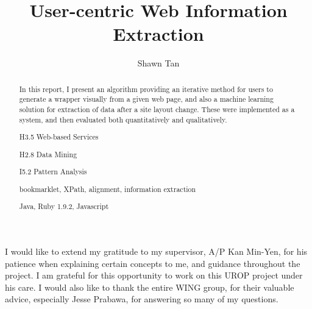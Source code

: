 \documentclass[urop]{socreport}
\begin{document}
\title{User-centric Web Information Extraction}
\author{Shawn Tan}
\maketitle
\begin{abstract}
In this report, I present an algorithm providing an iterative method for users to generate a 
wrapper visually from a given web page, and also a machine learning solution for extraction of
data after a site layout change. These were implemented as a system, and then evaluated 
both quantitatively and qualitatively. 

\begin{descriptors}
	\item H3.5 Web-based Services
    \item H2.8 Data Mining
	\item I5.2 Pattern Analysis
\end{descriptors}
\begin{keywords}
	bookmarklet,  XPath, alignment, information extraction
\end{keywords}
\begin{implement}
	Java, Ruby 1.9.2, Javascript
\end{implement}
\end{abstract}

\begin{acknowledgement}
	I would like to extend my gratitude to my supervisor, A/P Kan Min-Yen, for his patience
when explaining certain concepts to me, and guidance throughout the project. I am grateful
for this opportunity to work on this UROP project under his care. I would also like to thank
the entire WING group, for their valuable advice, especially Jesse Prabawa, for answering 
so many of my questions. 
\end{acknowledgement}

\listoffigures 
\listoftables
\tableofcontents 












\appendix

\end{document}
